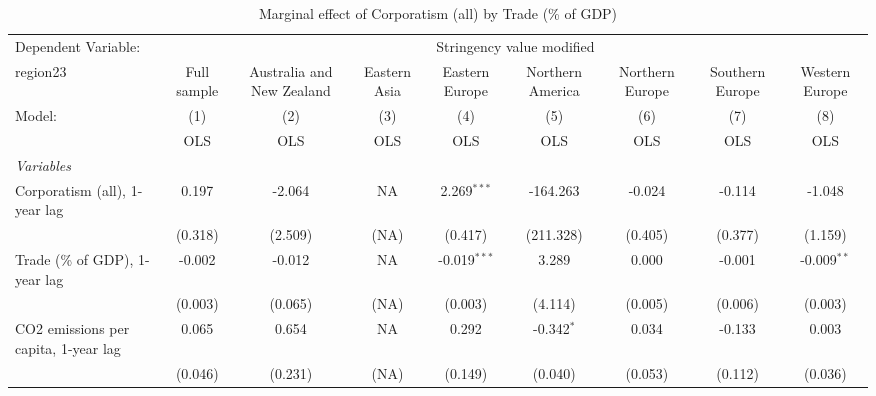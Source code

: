 
\begin{table}[htbp]
   \caption{Marginal effect of Corporatism (all) by Trade (\% of GDP)}
   \centering
   \begin{tabular}{lcccccccc}
      \toprule
      Dependent Variable: & \multicolumn{8}{c}{Stringency value modified}\\
      region23                                                       & Full sample   & Australia and New Zealand & Eastern Asia & Eastern Europe & Northern America & Northern Europe & Southern Europe & Western Europe \\   
      Model:                                                         & (1)           & (2)                       & (3)          & (4)            & (5)              & (6)             & (7)             & (8)\\  
                                                                     &  OLS          & OLS                       & OLS          & OLS            & OLS              & OLS             & OLS             & OLS\\  
      \midrule
      \emph{Variables}\\
      Corporatism (all), 1-year lag                                  & 0.197         & -2.064                    & NA           & 2.269$^{***}$  & -164.263         & -0.024          & -0.114          & -1.048\\   
                                                                     & (0.318)       & (2.509)                   & (NA)         & (0.417)        & (211.328)        & (0.405)         & (0.377)         & (1.159)\\   
      Trade (\% of GDP), 1-year lag                                  & -0.002        & -0.012                    & NA           & -0.019$^{***}$ & 3.289            & 0.000           & -0.001          & -0.009$^{**}$\\   
                                                                     & (0.003)       & (0.065)                   & (NA)         & (0.003)        & (4.114)          & (0.005)         & (0.006)         & (0.003)\\   
      CO2 emissions per capita, 1-year lag                           & 0.065         & 0.654                     & NA           & 0.292          & -0.342$^{*}$     & 0.034           & -0.133          & 0.003\\   
                                                                     & (0.046)       & (0.231)                   & (NA)         & (0.149)        & (0.040)          & (0.053)         & (0.112)         & (0.036)\\   

\end{tabular}
\end{table}
